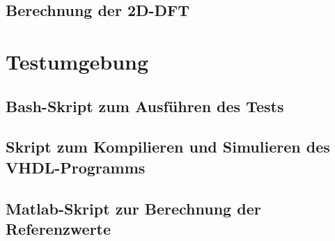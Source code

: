  \section{Berechnung der 2D-DFT}
 
 
 
 \chapter{Testumgebung}
 \section{Bash-Skript zum Ausführen des Tests}
 
 \section{Skript zum Kompilieren und Simulieren des VHDL-Programms}
 
 
 \section{Matlab-Skript zur Berechnung der Referenzwerte}
 
 
